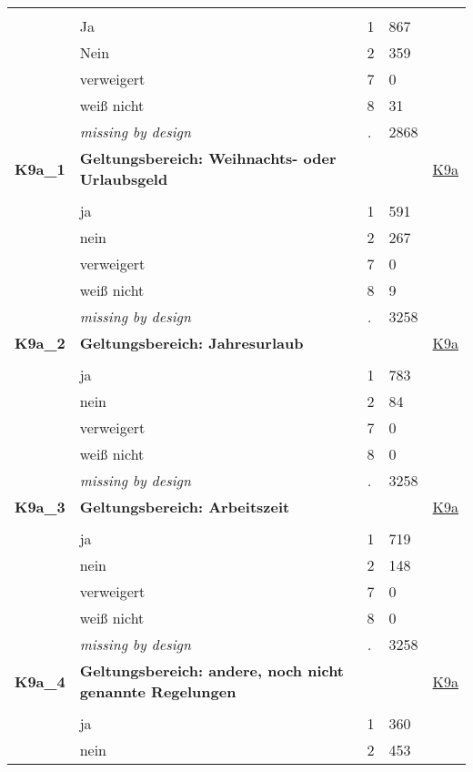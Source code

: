 \begin{longtable}{| L{2.65cm} | L{8cm} | C{1.5cm} | R{1.25cm} | C{2.25cm}  |}
   &  &  &  &  \\ 
   & Ja & 1 & 867 &  \\ 
   & Nein & 2 & 359 &  \\ 
   & verweigert & 7 & 0 &  \\ 
   & weiß nicht & 8 & 31 &  \\ 
   & \textit{missing by design} & \textit{.} & 2868 &  \\ 
   \midrule
\textbf{K9a\_1}\label{var:K9a:1} & \textbf{Geltungsbereich: Weihnachts- oder Urlaubsgeld} &  &  & \hyperref[K9a]{K9a} \\ 
   &  &  &  &  \\ 
   & ja & 1 & 591 &  \\ 
   & nein & 2 & 267 &  \\ 
   & verweigert & 7 & 0 &  \\ 
   & weiß nicht & 8 & 9 &  \\ 
   & \textit{missing by design} & \textit{.} & 3258 &  \\ 
   \midrule
\textbf{K9a\_2}\label{var:K9a:2} & \textbf{Geltungsbereich: Jahresurlaub} &  &  & \hyperref[K9a]{K9a} \\ 
   &  &  &  &  \\ 
   & ja & 1 & 783 &  \\ 
   & nein & 2 & 84 &  \\ 
   & verweigert & 7 & 0 &  \\ 
   & weiß nicht & 8 & 0 &  \\ 
   & \textit{missing by design} & \textit{.} & 3258 &  \\ 
   \midrule
\textbf{K9a\_3}\label{var:K9a:3} & \textbf{Geltungsbereich: Arbeitszeit} &  &  & \hyperref[K9a]{K9a} \\ 
   &  &  &  &  \\ 
   & ja & 1 & 719 &  \\ 
   & nein & 2 & 148 &  \\ 
   & verweigert & 7 & 0 &  \\ 
   & weiß nicht & 8 & 0 &  \\ 
   & \textit{missing by design} & \textit{.} & 3258 &  \\ 
   \midrule
\textbf{K9a\_4}\label{var:K9a:4} & \textbf{Geltungsbereich: andere, noch nicht genannte Regelungen} &  &  & \hyperref[K9a]{K9a} \\ 
   &  &  &  &  \\ 
   & ja & 1 & 360 &  \\ 
   & nein & 2 & 453 &  \\ 

\end{longtable}

